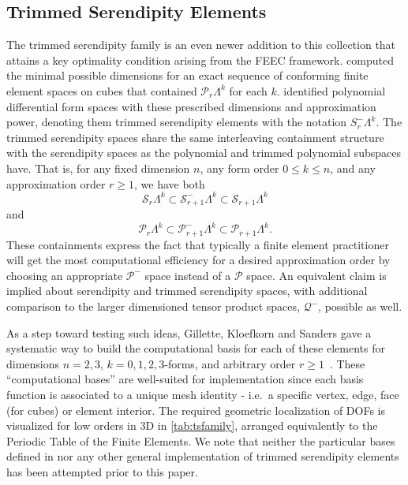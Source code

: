 \documentclass[format=acmsmall,screen,timestamp=false,a4paper]{acmart}
\newcommand{\calP}{\mathcal{P}}
\newcommand{\calQ}{\mathcal{Q}}
\newcommand{\calS}{\mathcal{S}}
\begin{document}
 
 
    
\subsection{Trimmed Serendipity Elements}
    The trimmed serendipity family is an even newer addition to this collection that attains a key optimality condition arising from the FEEC framework.
	\citet{christiansen2016constructions} computed the minimal possible dimensions for an exact sequence of conforming finite element spaces on cubes that contained $\calP_r\Lambda^k$ for each $k$.
	\citet{gillette2019trimmed} identified polynomial differential form spaces with these prescribed dimensions and approximation power, denoting them trimmed serendipity elements with the notation $S^-_r\Lambda^k$.  
	The trimmed serendipity spaces share the same interleaving containment structure with the serendipity spaces as the polynomial and trimmed polynomial subspaces have.  That is, for any fixed dimension $n$, any form order $0\leq k\leq n$, and any approximation order $r\geq 1$, we have both
\begin{equation*}
      \calS_r \Lambda^k \subset \calS^-_{r+1} \Lambda^k \subset \calS_{r+1} \Lambda^k
  \end{equation*}
  and   
   \begin{equation*}
      \calP_r \Lambda^k \subset \calP^-_{r+1} \Lambda^k \subset \calP_{r+1} \Lambda^k.
  \end{equation*}
	These containments express the fact that typically a finite element practitioner will get the most computational efficiency for a desired approximation order by choosing an appropriate $\calP^-$ space instead of a $\calP$ space.
	An equivalent claim is implied about serendipity and trimmed serendipity spaces, with additional comparison to the larger dimensioned tensor product spaces, $\calQ^-$, possible as well.

As a step toward testing such ideas, Gillette, Kloefkorn and Sanders gave a systematic way to build the computational basis for each of these elements for dimensions $n = 2, 3$, $k=0, 1, 2, 3$-forms, and arbitrary order $r \geq 1$~\cite{gillette2019computational}.
These ``computational bases'' are well-suited for implementation since each basis function is associated to a unique mesh identity - i.e.\ a specific vertex, edge, face (for cubes) or element interior.
The required geometric localization of DOFs is visualized for low orders in 3D in \cref{tab:tsfamily}, arranged equivalently to the Periodic Table of the Finite Elements.
We note that neither the particular bases defined in \citet{gillette2019computational} nor any other general implementation of trimmed serendipity elements has been attempted prior to this paper.
\end{document}
